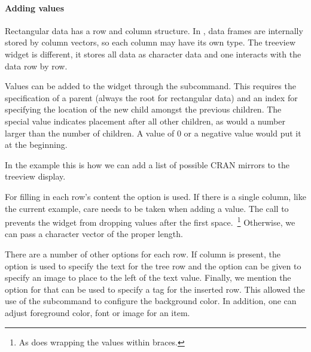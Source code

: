 \paragraph{Adding values}

Rectangular data has a row and column structure. In \R, data frames
are internally stored by column vectors, so each column may have its
own type. The treeview widget is different, it stores all data as
character data and one interacts with the data row by row.

Values can be added to the widget through the
subcommand. This requires the specification of a parent (always the root
\qcode{} for rectangular data) and an index for specifying the
location of the new child amongst the previous children. The special
value  indicates placement after all other children, as
would a number larger than the number of children. A value of 0 or a
negative value would put it at the beginning.


In the example this is how we can add a list of possible CRAN mirrors
to the treeview display.
\begin{Schunk}
\end{Schunk}

For filling in each row's content the  option is used. If
there is a single column, like the current example, care needs to be
taken when adding a value. The call to  prevents
the widget from dropping values after the first space.~\footnote{As
  does wrapping the values within braces.} Otherwise, we can pass a
character vector of the proper length.


There are a number of other options for each row. If column 
is present, the  option is used to specify the text for the
tree row and the option  can be given to specify an image
to place to the left of the text value. Finally, we mention the
 option for  that can be used to specify a tag
for the inserted row. This allowed the use of the subcommand
 to configure the background
color. In addition, one can adjust foreground color, font or image for
an item.



